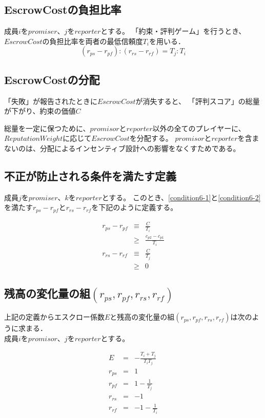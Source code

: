 \subsection{EscrowCostの負担比率}
成員$i$を$promiser$、$j$を$reporter$とする。
「約束・評判ゲーム」を行うとき、$EscrowCost$の負担比率を両者の最低信頼度$T_i$を用いる．\\

\begin{equation}
  (r_{ps} - r_{pf}):(r_{rs} - r_{rf}) = T_j:T_i
\end{equation}

\subsection{EscrowCostの分配}
「失敗」が報告されたときに$EscrowCost$が消失すると、
「評判スコア」の総量が下がり、約束の価値$C$

総量を一定に保つために、$promisor$と$reporter$以外の全てのプレイヤーに、
$ReputationWeight$に応じて$EscrowCost$を分配する。
$promisor$と$reporter$を含まないのは、分配によるインセンティブ設計への影響をなくすためである。

\subsection{不正が防止される条件を満たす定義}
成員$j$を$promiser$、$k$を$reporter$とする。
このとき、\eqref{condition6-1}と\eqref{condition6-2}を満たす$r_{ps} - r_{pf}$と$r_{rs} - r_{rf}$を下記のように定義する。

\begin{eqnarray}
  r_{ps} - r_{pf} &\equiv& \frac{C}{T_i} \label{condition6-3} \\
                  &\geq& \frac{c_{p2} - c_{p1}}{T_i} \nonumber \\
  r_{rs} - r_{rf} &\equiv& \frac{C}{T_j} \label{condition6-4} \\
                  &\geq& 0 \nonumber
\end{eqnarray}

\subsection{残高の変化量の組$ (r_{ps}, r_{pf}, r_{rs}, r_{rf}) $}
上記の定義からエスクロー係数$E$と残高の変化量の組$ (r_{ps}, r_{pf}, r_{rs}, r_{rf}) $は次のように求まる． \\
成員$i$を$promisor$、$j$を$reporter$とする。

\begin{eqnarray}
  E &=& - \frac{T_i + T_j}{T_i T_j} \\
  r_{ps} &=& 1 \\
  r_{pf} &=& 1 - \frac{1}{T_j} \\
  r_{rs} &=& -1 \\
  r_{rf} &=& -1 - \frac{1}{T_i}
\end{eqnarray}
